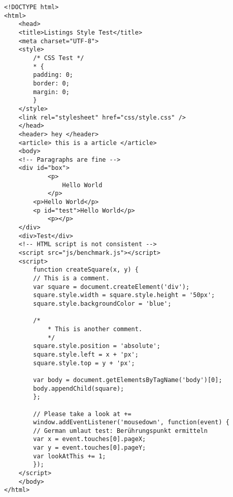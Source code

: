 \begin{lstlisting}[style=htmlcssjs, title=HTML注释]
<!DOCTYPE html>
<html>
    <head>
    <title>Listings Style Test</title>
    <meta charset="UTF-8">
    <style>
        /* CSS Test */
        * {
        padding: 0;
        border: 0;
        margin: 0;
        }
    </style>
    <link rel="stylesheet" href="css/style.css" />
    </head>
    <header> hey </header>
    <article> this is a article </article>
    <body>
    <!-- Paragraphs are fine -->
    <div id="box">			
            <p>
                Hello World
            </p>
        <p>Hello World</p>
        <p id="test">Hello World</p>
            <p></p>
    </div>
    <div>Test</div>
    <!-- HTML script is not consistent -->
    <script src="js/benchmark.js"></script>
    <script>
        function createSquare(x, y) {
        // This is a comment.
        var square = document.createElement('div');
        square.style.width = square.style.height = '50px';
        square.style.backgroundColor = 'blue';
        
        /*
            * This is another comment.
            */
        square.style.position = 'absolute';
        square.style.left = x + 'px'; 
        square.style.top = y + 'px';
        
        var body = document.getElementsByTagName('body')[0];
        body.appendChild(square);
        };
        
        // Please take a look at +=
        window.addEventListener('mousedown', function(event) {
        // German umlaut test: Berührungspunkt ermitteln
        var x = event.touches[0].pageX;
        var y = event.touches[0].pageY;
        var lookAtThis += 1;
        });
    </script>
    </body>
</html>
\end{lstlisting}